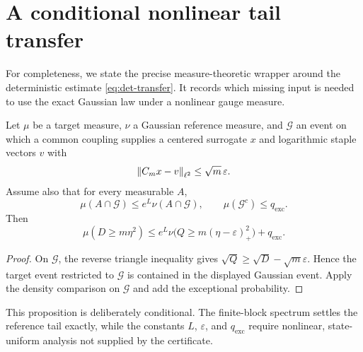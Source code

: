 \section{A conditional nonlinear tail transfer}
\label{app:transfer}

For completeness, we state the precise measure-theoretic wrapper around the
deterministic estimate \eqref{eq:det-transfer}.  It records which missing
input is needed to use the exact Gaussian law under a nonlinear gauge measure.

\begin{proposition}
Let $\mu$ be a target measure, $\nu$ a Gaussian reference measure, and
$\mathcal G$ an event on which a common coupling supplies a centered surrogate
$x$ and logarithmic staple vectors $v$ with
\[
 \left\lVert C_mx-v\right\rVert_{\ell^2}\le\sqrt m\,\varepsilon.
\]
Assume also that for every measurable $A$,
\[
 \mu(A\cap\mathcal G)\le e^L\nu(A\cap\mathcal G),
 \qquad \mu(\mathcal G^c)\le q_{\mathrm{exc}}.
\]
Then
\[
 \mu(D\ge m\eta^2)
 \le e^L\nu\bigl(Q\ge m(\eta-\varepsilon)_+^2\bigr)
 +q_{\mathrm{exc}}.
\]
\end{proposition}

\begin{proof}
On $\mathcal G$, the reverse triangle inequality gives
$\sqrt Q\ge\sqrt D-\sqrt m\varepsilon$.  Hence the target event restricted to
$\mathcal G$ is contained in the displayed Gaussian event.  Apply the density
comparison on $\mathcal G$ and add the exceptional probability.
\end{proof}

This proposition is deliberately conditional.  The finite-block spectrum
settles the reference tail exactly, while the constants $L$, $\varepsilon$,
and $q_{\mathrm{exc}}$ require nonlinear, state-uniform analysis not supplied
by the certificate.
